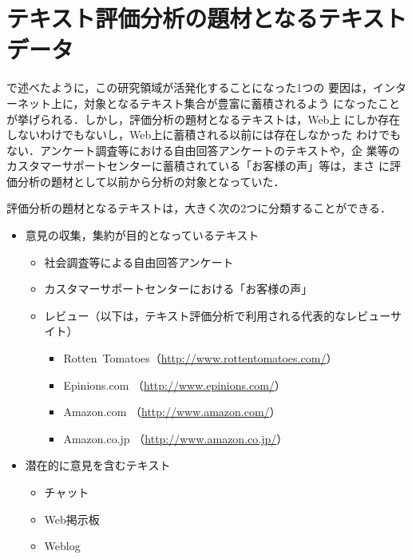 \section{テキスト評価分析の題材となるテキストデータ}
\label{sec:daizai}

で述べたように，この研究領域が活発化することになった1つの
要因は，インターネット上に，対象となるテキスト集合が豊富に蓄積されるよう
になったことが挙げられる．しかし，評価分析の題材となるテキストは，Web上
にしか存在しないわけでもないし，Web上に蓄積される以前には存在しなかった
わけでもない．アンケート調査等における自由回答アンケートのテキストや，企
業等のカスタマーサポートセンターに蓄積されている「お客様の声」等は，まさ
に評価分析の題材として以前から分析の対象となっていた．

評価分析の題材となるテキストは，大きく次の2つに分類することができる．

\begin{itemize}
 \item 意見の収集，集約が目的となっているテキスト

\begin{itemize}
 \item 社会調査等による自由回答アンケート

 \item カスタマーサポートセンターにおける「お客様の声」

 \item レビュー（以下は，テキスト評価分析で利用される代表的なレビューサ
       イト）
 \begin{itemize}
  \item Rotten~Tomatoes（\url{http://www.rottentomatoes.com/}）
  \item Epinions.com （\url{http://www.epinions.com/}）
  \item Amazon.com （\url{http://www.amazon.com/}）
  \item Amazon.co.jp （\url{http://www.amazon.co.jp/}）
 \end{itemize}
\end{itemize}

 \item 潜在的に意見を含むテキスト

\begin{itemize}
 \item チャット
 \item Web掲示板
 \item Weblog
\end{itemize}
\end{itemize}

